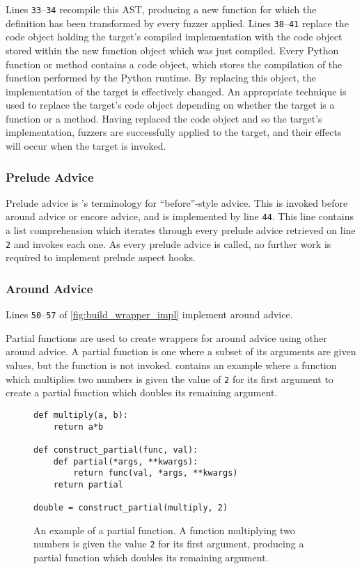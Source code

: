 Lines \texttt{33}--\texttt{34} recompile this AST, producing a new function for
which the definition has been transformed by every fuzzer applied. Lines
\texttt{38}--\texttt{41} replace the code object holding the target's compiled
implementation with the code object stored within the new function object which
was just compiled. Every Python function or method contains a code object, which
stores the compilation of the function performed by the Python runtime. By
replacing this object, the implementation of the target is effectively changed.
An appropriate technique is used to replace the target's code object depending
on whether the target is a function or a method. Having replaced the code object
and so the target's implementation, fuzzers are successfully applied to the
target, and their effects will occur when the target is invoked.


\subsubsection{Prelude Advice}

Prelude advice is \pdsf{}'s terminology for ``before''-style advice. This is
invoked before around advice or encore advice, and is implemented by line
\texttt{44}. This line contains a list comprehension which iterates through
every prelude advice retrieved on line \texttt{2} and invokes each one. As every
prelude advice is called, no further work is required to implement prelude
aspect hooks.

\subsubsection{Around Advice}

Lines \texttt{50}--\texttt{57} of \cref{fig:build_wrapper_impl} implement around advice.

Partial functions are used to create wrappers for around advice using other
around advice. A partial function is one where a subset of its arguments are
given values, but the function is not invoked.
 contains an example where a function
which multiplies two numbers is given the value of \lstinline{2} for its first
argument to create a partial function which doubles its remaining argument.

\begin{figure}
\begin{lstlisting}
def multiply(a, b):
    return a*b

def construct_partial(func, val):
    def partial(*args, **kwargs):
        return func(val, *args, **kwargs)
    return partial

double = construct_partial(multiply, 2)
\end{lstlisting}
\caption{An example of a partial function. A function multiplying two numbers is
given the value \lstinline{2} for its first argument, producing a partial
function which doubles its remaining argument.}
\label{fig:partial_function_explanation}
\end{figure}

